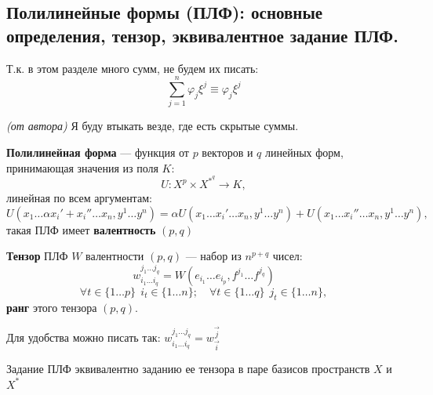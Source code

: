 \subsection{Полилинейные формы (ПЛФ): основные определения, тензор, эквивалентное задание ПЛФ.}
\begin{remark}
    Т.к. в этом разделе много сумм, не будем их писать: $$\sum\limits_{j=1}^n\varphi_j\xi^j\equiv \varphi_j\xi^j$$
\end{remark}
\begin{remark}
    \textit{(от автора) } Я буду втыкать \Warning везде, где есть скрытые суммы.
\end{remark}
\begin{definition}
    \textbf{Полилинейная форма} --- функция от $p$ векторов и $q$ линейных форм, принимающая значения из поля $K$: $$U: X^p\times X^{*^{q}}\to K,$$ линейная по всем аргументам: $$U(x_1\ldots \alpha x_i'+x_i''\ldots x_n,y^1\ldots y^n)=\alpha U(x_1\ldots x_i'\ldots x_n,y^1\ldots y^n)+U(x_1\ldots x_i''\ldots x_n,y^1\ldots y^n),$$ такая ПЛФ имеет \textbf{валентность} $(p,q)$
\end{definition}
\begin{definition}
    \textbf{Тензор} ПЛФ $W$ валентности $(p,q)$ --- набор из $n^{p+q}$ чисел:
    $$w^{j_1\ldots j_q}_{i_1\ldots i_q}=W(e_{i_1}\ldots e_{i_p},f^{j_1}\ldots f^{j_q})$$
    $$\forall t\in\{1\ldots p\}\ \ i_t\in\{1\ldots n\}; \quad \forall t\in\{1\ldots q\}\ \ j_t\in\{1\ldots n\},$$ \textbf{ранг} этого тензора $(p, q)$.
\end{definition}
\begin{remark}
    Для удобства можно писать так: $w^{j_1\ldots j_q}_{i_1\ldots i_q}=w^{\vec j}_{\vec i}$
\end{remark}
\begin{theorem}
    Задание ПЛФ эквивалентно заданию ее тензора в паре базисов пространств $X$ и $X^*$
\end{theorem}
